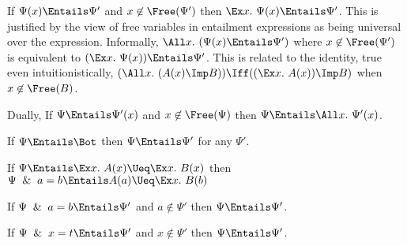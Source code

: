   \item If $\Psi(x) \Entails\Psi'$ and $x\not\in\Free(\Psi')$ then
    $\Ex x.~\Psi(x)\Entails\Psi'$.  This is justified by the view of
    free variables in entailment expressions as being universal over
    the expression.  Informally, $\All x.\ (\Psi(x)\Entails \Psi')$ where
    $x\not\in\Free(\Psi')$ is equivalent to $(\Ex x.~\Psi(x))\Entails \Psi'$.
    This is related to the identity, true even intuitionistically,
    $(\All x.~(A(x)\Imp B)) \Iff ((\Ex x.~A(x)) \Imp B)$ when $x\not\in\Free(B)$.
  \item Dually, If $\Psi\Entails\Psi'(x)$ and $x\not\in\Free(\Psi)$ then
    $\Psi\Entails\All x.~\Psi'(x)$.
  \item If $\Psi\Entails\Bot$ then $\Psi\Entails\Psi'$ for any $\Psi'$.
  \item If $\Psi\Entails \Ex x.~A(x)\Ueq \Ex x.~B(x)$ then
    $\Psi\And a=b\Entails A(a)\Ueq \Ex x.~B(b)$
  \item If $\Psi\And a=b\Entails \Psi'$ and $a\not\in\Psi'$ then $\Psi\Entails\Psi'$.
  \item If $\Psi\And x=t\Entails \Psi'$ and $x\not\in\Psi'$ then $\Psi\Entails\Psi'$.

